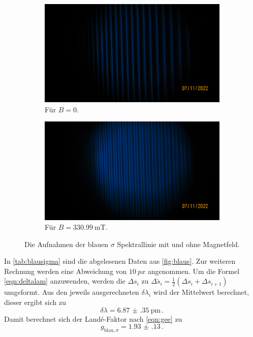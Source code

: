     \begin{figure}%
      \begin{subfigure}{0.48\textwidth}%
        \centering%
        \includegraphics[width=\textwidth]{pictures/IMG_0007.JPG}%
        \caption{Für $B = \num{0}$.}%
        \label{fig:pic_blaus_0}%
      \end{subfigure}%
      \hfill%
      \begin{subfigure}{0.48\textwidth}%
        \centering%
        \includegraphics[width=\textwidth]{pictures/IMG_0008.JPG}%
        \caption{Für $B = \SI{330.99}{\milli\tesla}$.}%
        \label{fig:pic_blaus_B}%
      \end{subfigure}%
      \caption{Die Aufnahmen der blauen $\sigma$ Spektrallinie mit und ohne Magnetfeld.}%
      \label{fig:blaus}%
    \end{figure}

    \noindent 
    In \autoref{tab:blausigma} sind die abgelesenen Daten aus \autoref{fig:blaus}. Zur weiteren Rechnung werden eine Abweichung von $\SI{10}{px}$ angenommen. 
    Um die Formel \eqref{eqn:deltalam} anzuwenden, werden die $\Delta s_i$ zu $\Delta \tilde{s}_i = \frac{1}{2} (\Delta s_i + \Delta s_{i+1})$ umgeformt. Aus den jeweils 
    ausgerechneten $\delta \lambda_i$ wird der Mittelwert berechnet, dieser ergibt sich zu 
    \begin{equation*}
      \delta \lambda = \SI{6.87(35)}{\pico\metre}\, .
    \end{equation*}
    Damit berechnet sich der Land\'{e}-Faktor nach \eqref{eqn:gee} zu 
    \begin{equation*}
      g_{\text{blau}, \sigma} = \num{1.93(13)}\, .
    \end{equation*}
    
